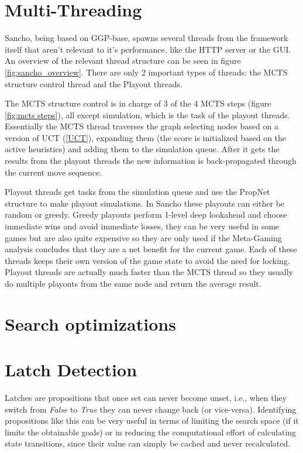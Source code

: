 \section{Multi-Threading}
Sancho, being based on GGP-base, spawns several threads from the framework itself that aren't relevant to it's performance, like the HTTP server or the GUI.
An overview of the relevant thread structure can be seen in figure \ref{fig:sancho_overview}. There are only 2 important types of threads: the MCTS structure control thread and the Playout threads.

The MCTS structure control is in charge of 3 of the 4 MCTS steps (figure \ref{fig:mcts steps}), all except simulation, which is the task of the playout threads.
Essentially the MCTS thread traverses the graph selecting nodes based on a version of UCT (\ref{UCT}), expanding them (the score is initialized based on the active heuristics) and adding them to the simulation queue. After it gets the results from the playout threads the new information is back-propagated through the current move sequence.

Playout threads get tasks from the simulation queue and use the PropNet structure to make playout simulations. In Sancho these playouts can either be random or greedy. Greedy playouts perform 1-level deep lookahead and choose immediate wins and avoid immediate losses, they can be very useful in some games but are also quite expensive so they are only used if the Meta-Gaming analysis concludes that they are a net benefit for the current game. Each of these threads keeps their own version of the game state to avoid the need for locking. Playout threads are actually much faster than the MCTS thread so they usually do multiple playouts from the same node and return the average result.


\section{Search optimizations}

\section{Latch Detection}
Latches are propositions that once set can never become unset, i.e., when they switch from \textit{False} to \textit{True} they can never change back (or vice-versa). Identifying propositions like this can be very useful in terms of limiting the search space (if it limits the obtainable goals) or in reducing the computational effort of calculating state transitions, since their value can simply be cached and never recalculated.

